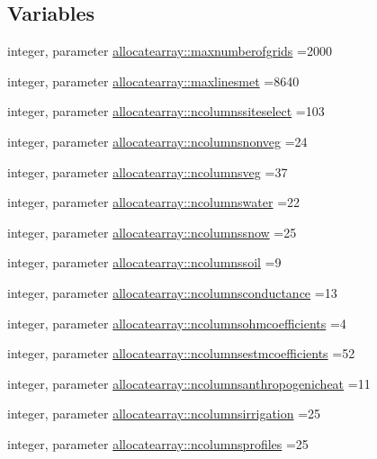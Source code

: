 \subsection*{Variables}
\begin{DoxyCompactItemize}
\item 
integer, parameter \hyperlink{namespaceallocatearray_a45073e6d9fc2dcbf2ca53fceaec41888}{allocatearray\+::maxnumberofgrids} =2000
\item 
integer, parameter \hyperlink{namespaceallocatearray_af1e1f509de59466fc7517530d095f3c0}{allocatearray\+::maxlinesmet} =8640
\item 
integer, parameter \hyperlink{namespaceallocatearray_a0fc6d13698e2122d715ea6e5758194d9}{allocatearray\+::ncolumnssiteselect} =103
\item 
integer, parameter \hyperlink{namespaceallocatearray_a820ebcf66504982dee392a9c3a224fe2}{allocatearray\+::ncolumnsnonveg} =24
\item 
integer, parameter \hyperlink{namespaceallocatearray_a6b492adaf9d6e5563a21d571d5b8f6ec}{allocatearray\+::ncolumnsveg} =37
\item 
integer, parameter \hyperlink{namespaceallocatearray_a58f6aaf0837a4d8d3383254237a26732}{allocatearray\+::ncolumnswater} =22
\item 
integer, parameter \hyperlink{namespaceallocatearray_af347c941e3c24ef04005876d0d351505}{allocatearray\+::ncolumnssnow} =25
\item 
integer, parameter \hyperlink{namespaceallocatearray_a0e0e9877b1623ca21932a4793c7b8641}{allocatearray\+::ncolumnssoil} =9
\item 
integer, parameter \hyperlink{namespaceallocatearray_a2830c674e41c46900c1088c40baef680}{allocatearray\+::ncolumnsconductance} =13
\item 
integer, parameter \hyperlink{namespaceallocatearray_a290704d8211d9850cffa53e494c6821e}{allocatearray\+::ncolumnsohmcoefficients} =4
\item 
integer, parameter \hyperlink{namespaceallocatearray_ab6963e51ec24ecb58c1ee21fd8a70654}{allocatearray\+::ncolumnsestmcoefficients} =52
\item 
integer, parameter \hyperlink{namespaceallocatearray_aa1105086801cd6c5c6be1d9563c93341}{allocatearray\+::ncolumnsanthropogenicheat} =11
\item 
integer, parameter \hyperlink{namespaceallocatearray_ae577fdefdd007ae24a4d46e52bbcd217}{allocatearray\+::ncolumnsirrigation} =25
\item 
integer, parameter \hyperlink{namespaceallocatearray_a505dab229d9725bdbe44d06de37dceba}{allocatearray\+::ncolumnsprofiles} =25

\end{DoxyCompactItemize}
